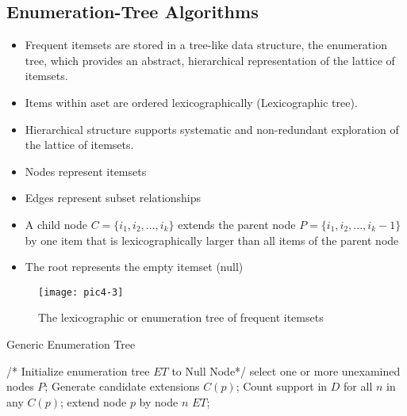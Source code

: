 \documentclass[../notes.tex]{subfiles}
\begin{document}
\subsection{Enumeration-Tree Algorithms}
\begin{itemize}
  \item Frequent itemsets are stored in a tree-like data structure, the enumeration tree, which provides an abstract, hierarchical representation of the lattice of itemsets.
  \item Items within aset are ordered lexicographically (Lexicographic tree).
  \item Hierarchical structure supports systematic and non-redundant exploration of the lattice of itemsets. \\
  
  \item Nodes represent itemsets
  \item Edges represent subset relationships
  \item A child node $C = \{i_1, i_2, ..., i_k\}$ extends the parent node $P = \{i_1, i_2, ..., i_k-1\}$ by one item that is lexicographically larger than all items of the parent node
  \item The root represents the empty itemset (null)
\end{itemize}

\begin{figure}[h]
\centering
\caption{The lexicographic or enumeration tree of frequent itemsets}
\texttt{[image: pic4-3]}
\end{figure}

\begin{algorithm}
\caption{Generic Enumeration Tree}
\begin{algorithmic}[0]
\State /* Initialize enumeration tree $ET$ to Null Node*/
  \State select one or more unexamined nodes $P$;
    \State Generate candidate extensions $C(p)$;
  \EndFor
  \State Count support in $D$ for all $n$ in any $C(p)$;
    \State extend node $p$ by node $n$
  \EndIf
\EndWhile
\Return $ET$;
\EndFunction
\end{algorithmic}
\end{algorithm}
\end{document}
